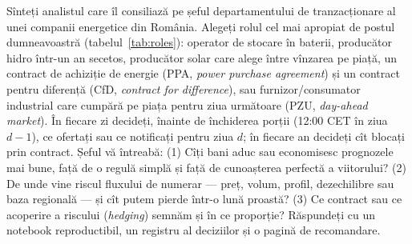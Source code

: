 \begin{scenario}
%
{Sînteți analistul care îl consiliază pe șeful departamentului de tranzacționare al unei companii energetice din România. Alegeți rolul cel mai apropiat de postul dumneavoastră (tabelul~\ref{tab:roles}):
operator de stocare în baterii, producător hidro într-un an secetos, producător solar care alege între vînzarea pe piață, un contract de achiziție de energie (PPA, \emph{power purchase agreement}) și un contract pentru diferență (CfD, \emph{contract for difference}),
sau furnizor/consumator industrial care cumpără pe piața pentru ziua următoare (PZU, \emph{day-ahead market}).
În fiecare zi decideți, înainte de închiderea porții (12:00 CET în ziua $d-1$), ce ofertați sau ce notificați pentru ziua $d$; în fiecare an decideți cît blocați prin contract.
Șeful vă întreabă: (1) Cîți bani aduc sau economisesc prognozele mai bune, față de o regulă simplă și față de cunoașterea perfectă a viitorului?
(2) De unde vine riscul fluxului de numerar --- preț, volum, profil, dezechilibre sau baza regională --- și cît putem pierde într-o lună proastă?
(3) Ce contract sau ce acoperire a riscului (\emph{hedging}) semnăm și în ce proporție? Răspundeți cu un notebook reproductibil, un registru al deciziilor și o pagină de recomandare.}
\end{scenario}

